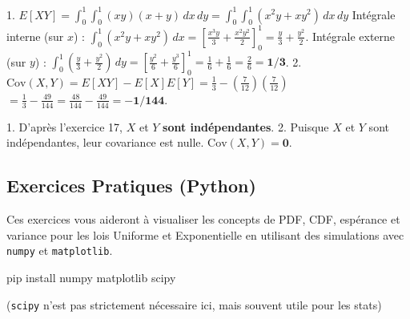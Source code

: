 \begin{correctionbox}
1.  $E[XY] = \int_0^1 \int_0^1 (xy)(x+y) \, dx \, dy = \int_0^1 \int_0^1 (x^2y + xy^2) \, dx \, dy$
    Intégrale interne (sur $x$) : $\int_0^1 (x^2y + xy^2) \, dx = \left[ \frac{x^3y}{3} + \frac{x^2y^2}{2} \right]_0^1 = \frac{y}{3} + \frac{y^2}{2}$.
    Intégrale externe (sur $y$) : $\int_0^1 (\frac{y}{3} + \frac{y^2}{2}) \, dy = \left[ \frac{y^2}{6} + \frac{y^3}{6} \right]_0^1 = \frac{1}{6} + \frac{1}{6} = \frac{2}{6} = \mathbf{1/3}$.
2.  $\text{Cov}(X, Y) = E[XY] - E[X]E[Y] = \frac{1}{3} - \left(\frac{7}{12}\right)\left(\frac{7}{12}\right)$
    $= \frac{1}{3} - \frac{49}{144} = \frac{48}{144} - \frac{49}{144} = \mathbf{-1/144}$.
\end{correctionbox}

\begin{correctionbox}
1.  D'après l'exercice 17, $X$ et $Y$ \textbf{sont indépendantes}.
2.  Puisque $X$ et $Y$ sont indépendantes, leur covariance est nulle.
    $\text{Cov}(X, Y) = \mathbf{0}$.
\end{correctionbox}

\subsection{Exercices Pratiques (Python)}

Ces exercices vous aideront à visualiser les concepts de PDF, CDF, espérance et variance pour les lois Uniforme et Exponentielle en utilisant des simulations avec \texttt{numpy} et \texttt{matplotlib}.

\begin{codecell}
pip install numpy matplotlib scipy
\end{codecell}
(\texttt{scipy} n'est pas strictement nécessaire ici, mais souvent utile pour les stats)

